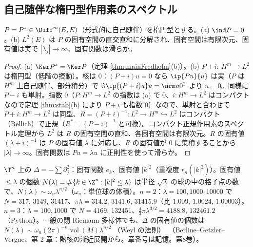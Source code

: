 \subsection{自己随伴な楕円型作用素のスペクトル}
\begin{thm}\label{thm:spectral}\tP
$P=P^*\in\Diff^m(E,E)$（形式的に自己随伴）を楕円型とする。(a) $\ind P=0$。(b) $L^2(E)$ は $P$ の固有空間の直交直和に分解され、固有空間は有限次元、固有値は実で $|\lambda_j|\to\infty$、固有関数は滑らか。
\end{thm}
\begin{proof}
(a) $\Ker P^*=\Ker P$（定理 \ref{thm:mainFredholm}(b)）。(b) $P+i:\ H^m\to L^2$ は楕円型（低階の摂動）。核は $0$：$(P+i)u=0$ なら $\ip{Pu}{u}$ は実（$P$ は $H^m$ 上自己随伴、部分積分）で $\Im\ip{(P+i)u}u=\nrm u0^2$ より $u=0$。同様に $P-i$ も単射。指数 $0$（$P:H^m\to L^2$ の指数は (a) で $0$、$i:H^m\to L^2$ はコンパクトなので定理 \ref{thm:stab}(b) により $P+i$ も指数 $0$）なので、単射と合わせて $P+i:H^m\to L^2$ は同型、$R=(P+i)^{-1}:L^2\to H^m\hookrightarrow L^2$ はコンパクト（Rellich）で正規（$R^*=(P-i)^{-1}$ と可換）。コンパクト正規作用素のスペクトル定理から $L^2$ は $R$ の固有空間の直和、各固有空間は有限次元。$R$ の固有値 $(\lambda+i)^{-1}$ は $P$ の固有値 $\lambda$ に対応し、$R$ の固有値が $0$ に集積することから $|\lambda|\to\infty$。固有関数は $Pu=\lambda u$ に正則性を使って滑らか。
\end{proof}

\begin{ex}\label{ex:weyl}
$\T^n$ 上の $\Delta=-\sum\partial_j^2$：固有関数 $e_k$、固有値 $|k|^2$（重複度 $r_n(|k|^2)$）。固有値 $\le\lambda$ の個数 $N(\lambda)=\#\{k\in\Z^n:|k|^2\le\lambda\}$ は半径 $\sqrt\lambda$ の球の中の格子点の数で、$N(\lambda)\sim\omega_n\lambda^{n/2}$（$\omega_n$：単位球の体積）。$n=2$：$\lambda=100,1000,10000$ で $N=317,\,3149,\,31417$、$\pi\lambda=314.2,\,3141.6,\,31415.9$（比 $1.009,\,1.0024,\,1.00003$）。$n=3$：$\lambda=100,1000$ で $N=4169,\,132451$、$\frac43\pi\lambda^{3/2}=4188.8,\,132461.2$（Python）。一般の閉 Riemann 多様体でも、$\Delta$ の固有値の個数は $N(\lambda)\sim\omega_n(2\pi)^{-n}\operatorname{vol}(M)\lambda^{n/2}$ （Weyl の法則）\tC\ （Berline--Getzler--Vergne、第 2 章：熱核の漸近展開から。章番号は記憶\tQ。第8巻）。
\end{ex}

